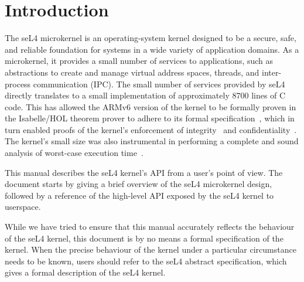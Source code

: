 %
%
%

\chapter{\label{ch:intro}Introduction}


The seL4 microkernel is an operating-system kernel designed to be
a secure, safe, and reliable foundation for systems in a wide variety of
application domains. As a microkernel, it provides a small number of
services to applications, such as abstractions to create and manage virtual address
spaces, threads, and inter-process communication (IPC). The small number
of services provided by seL4 directly translates to a small
implementation of approximately $8700$ lines of C code. This has allowed
the ARMv6 version of the kernel to be formally proven in the Isabelle/HOL 
theorem prover to adhere to its formal
specification~\cite{Boyton_09,Cock_KS_08,Derrin_EKCC_06,Elkaduwe_GE_08,Klein_EHACDEEKNSTW_09,Tuch_KN_07,Winwood_KSACN_09},
which in turn enabled proofs of the kernel's enforcement of
integrity~\cite{Sewell_WGMAK_11} and
confidentiality~\cite{Murray_MBGBSLGK_13}. The kernel's small size was
also instrumental in performing a complete and sound analysis of
worst-case execution time~\cite{Blackham_SCRH_11,Blackham_SH_12}.

This manual describes the seL4 kernel's API from a user's point of view.
The document starts by giving a brief overview of the seL4 microkernel
design, followed by a reference of the high-level API exposed by the
seL4 kernel to userspace.

While we have tried to ensure that this manual accurately reflects the
behaviour of the seL4 kernel, this document is by no means a formal
specification of the kernel. When the precise behaviour of the kernel
under a particular circumstance needs to be known, users should refer to
the seL4 abstract specification, which
gives a formal description of the seL4 kernel.
